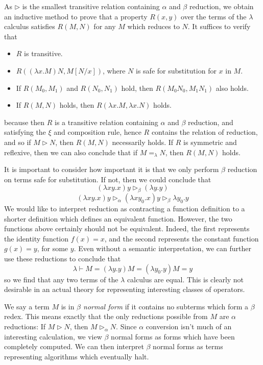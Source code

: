As $\rhd$ is the smallest transitive relation containing $\alpha$ and $\beta$ reduction, we obtain an inductive method to prove that a property $R(x,y)$ over the terms of the $\lambda$ calculus satisfies $R(M,N)$ for any $M$ which reduces to $N$. It suffices to verify that
%
\begin{itemize}
    \item $R$ is transitive.
    \item $R((\lambda x.M)N, M[N/x])$, where $N$ is safe for substitution for $x$ in $M$.
    \item If $R(M_0, M_1)$ and $R(N_0, N_1)$ hold, then $R(M_0 N_0, M_1 N_1)$ also holds.
    \item If $R(M,N)$ holds, then $R(\lambda x.M, \lambda x.N)$ holds.
\end{itemize}
%
because then $R$ is a transitive relation containing $\alpha$ and $\beta$ reduction, and satisfying the $\xi$ and composition rule, hence $R$ contains the relation of reduction, and so if $M \rhd N$, then $R(M,N)$ necessarily holds. If $R$ is symmetric and reflexive, then we can also conclude that if $M =_\lambda N$, then $R(M,N)$ holds.

It is important to consider how important it is that we only perform $\beta$ reduction on terms safe for substitution. If not, then we could conclude that
%
\[ (\lambda xy.x)y \rhd_\beta (\lambda y.y) \]
%
\[ (\lambda xy.x)y \rhd_\alpha (\lambda xy_0.x)y \rhd_\beta \lambda y_0.y \]
%
We would like to interpret reduction as contracting a function definition to a shorter definition which defines an equivalent function. However, the two functions above certainly should not be equivalent. Indeed, the first represents the identity function $f(x) = x$, and the second represents the constant function $g(x) = y$, for some $y$. Even without a semantic interpretation, we can further use these reductions to conclude that
%
\[ \lambda \vdash M = (\lambda y.y)M = (\lambda y_0.y)M = y \]
%
so we find that any two terms of the $\lambda$ calculus are equal. This is clearly not desirable in an actual theory for representing interesting classes of operators.

We say a term $M$ is in \emph{$\beta$ normal form} if it contains no subterms which form a $\beta$ redex. This means exactly that the only reductions possible from $M$ are $\alpha$ reductions: If $M \rhd N$, then $M \rhd_\alpha N$. Since $\alpha$ conversion isn't much of an interesting calculation, we view $\beta$ normal forms as forms which have been completely computed. We can then interpret $\beta$ normal forms as terms representing algorithms which eventually halt.

